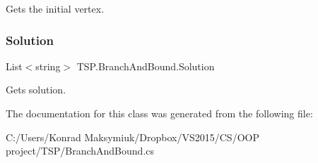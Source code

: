 Gets the initial vertex. 

\mbox{\label{class_t_s_p_1_1_branch_and_bound_a09726f63fe30fb54455b1b1f7b05d2d9}} 
\subsubsection{\texorpdfstring{Solution}{Solution}}
{\footnotesize\ttfamily List$<$string$>$ T\+S\+P.\+Branch\+And\+Bound.\+Solution\hspace{0.3cm}{\ttfamily [get]}}



Gets solution. 



The documentation for this class was generated from the following file\+:\begin{DoxyCompactItemize}
\item 
C\+:/\+Users/\+Konrad Maksymiuk/\+Dropbox/\+V\+S2015/\+C\+S/\+O\+O\+P project/\+T\+S\+P/Branch\+And\+Bound.\+cs\end{DoxyCompactItemize}
